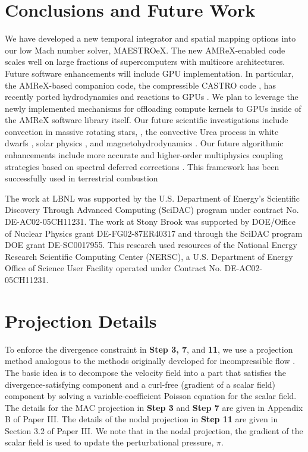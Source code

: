 \documentclass{aastex62}
\begin{document}
\section{Conclusions and Future Work}\label{sec:conclusions}
We have developed a new temporal integrator and spatial mapping options into our low Mach number solver, MAESTROeX.
The new AMReX-enabled code scales well on large fractions of supercomputers with multicore architectures.
Future software enhancements will include GPU implementation.
In particular, the AMReX-based companion code, the compressible CASTRO code \citep{CASTRO}, has recently ported hydrodynamics and reactions to GPUs \citep{CASTRO_GPU}.
We plan to leverage the newly implemented mechanisms for offloading compute kernels to GPUs inside of the AMReX software library itself.
Our future scientific investigations include convection in massive rotating stars, \citep{heger2000presupernova}, the convective Urca process in white dwarfs \citep{willcox2016type}, solar physics \citep{wood2018self}, and magnetohydrodynamics \citep{wood2015three,wood2011sun}.
Our future algorithmic enhancements include more accurate and higher-order multiphysics coupling strategies based on spectral deferred corrections \citep{dutt2000spectral,bourlioux2003high}.
This framework has been successfully used in terrestrial combustion \citep{pazner2016high,nonaka2018conservative}

\acknowledgements

The work at LBNL was supported by the U.S. Department of Energy's
Scientific Discovery Through Advanced Computing (SciDAC) program under
contract No. DE-AC02-05CH11231.  The work at Stony Brook was supported
by DOE/Office of Nuclear Physics grant DE-FG02-87ER40317 and through
the SciDAC program DOE grant DE-SC0017955.  This research used
resources of the National Energy Research Scientific Computing Center
(NERSC), a U.S. Department of Energy Office of Science User Facility
operated under Contract No. DE-AC02-05CH11231.




\appendix
\section{Projection Details}\label{Sec:Projection}
To enforce the divergence constraint in {\bf Step 3, 7}, and {\bf 11}, we use a projection method analogous to the methods originally developed for incompressible flow \citep{almgren1998conservative,bell1989second}.
The basic idea is to decompose the velocity field into a part that satisfies the divergence-satisfying component and a curl-free (gradient of a scalar field) component by solving a variable-coefficient Poisson equation for the scalar field.
The details for the MAC projection in {\bf Step 3} and {\bf Step 7} are given in Appendix B of Paper III.  The details of the nodal projection in {\bf Step 11} are given in Section 3.2 of Paper III.
We note that in the nodal projection, the gradient of the scalar field is used to update the perturbational pressure, $\pi$.
\end{document}
